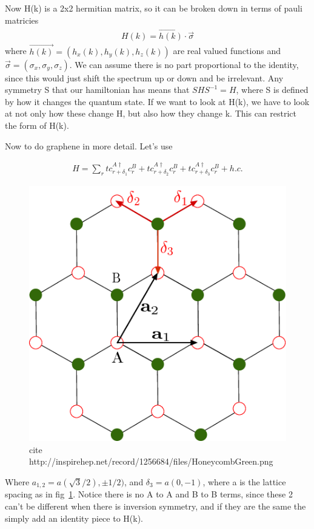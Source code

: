 Now H(k) is a 2x2 hermitian matrix, so it can be broken down in terms of pauli matricies
\begin{align}
H(k)=\vec{h(k)}\cdot \vec{\sigma}
\end{align}
where $\vec{h(k)} = (h_x(k),h_y(k),h_z(k))$ are real valued functions and $\vec{\sigma} = (\sigma_x,\sigma_y,\sigma_z)$. We can assume there is no part proportional to the identity, since this would just shift the spectrum up or down and be irrelevant. Any symmetry S that our hamiltonian has means that $SHS^{-1}=H$, where S is defined by how it changes the quantum state. If we want to look at H(k), we have to look at not only how these change H, but also how they change k.  This can restrict the form of H(k).

Now to do graphene in more detail. Let's use 

\begin{align}
H=\sum_{r} t c^{A\dag}_{r+\delta_1}c^B_r+ t c^{A\dag}_{r+\delta_2}c^B_r+ t c^{A\dag}_{r+\delta_3}c^B_r +h.c.
\end{align}
\begin{figure}
	\centering
	\includegraphics[width=0.5\linewidth]{images/HoneycombGreen}
	\caption{cite http://inspirehep.net/record/1256684/files/HoneycombGreen.png}
	\label{fig:honeycombgreen}
\end{figure}


Where $a_{1,2} =a(\sqrt{3}/2),\pm1/2)$, and $\delta_3 =a(0,-1) $, where a is the lattice spacing as in fig~\ref{fig:honeycombgreen}. Notice there is no A to A and B to B terms, since these 2 can't be different when there is inversion symmetry, and if they are the same the simply add an identity piece to H(k).

